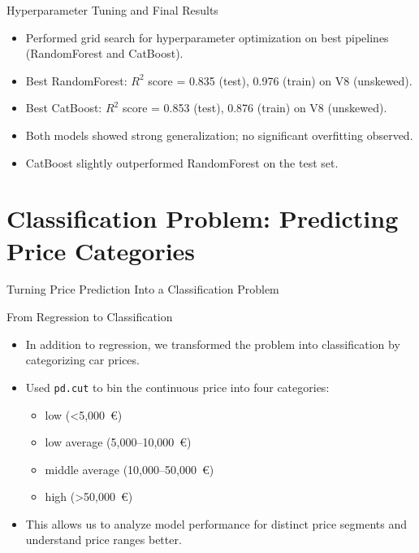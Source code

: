 \documentclass{beamer}
\begin{document}
\begin{frame}{Hyperparameter Tuning and Final Results}
    \begin{itemize}
        \item Performed grid search for hyperparameter optimization on best pipelines (RandomForest and CatBoost).
        \item Best RandomForest: $R^2$ score = 0.835 (test), 0.976 (train) on V8 (unskewed).
        \item Best CatBoost: $R^2$ score = 0.853 (test), 0.876 (train) on V8 (unskewed).
        \item Both models showed strong generalization; no significant overfitting observed.
        \item CatBoost slightly outperformed RandomForest on the test set.
    \end{itemize}
\end{frame}

\section{Classification Problem: Predicting Price Categories}
\begin{frame}
    \centering
    \Huge
    Turning Price Prediction Into a Classification Problem
\end{frame}


\begin{frame}{From Regression to Classification}
    \begin{itemize}
        \item In addition to regression, we transformed the problem into classification by categorizing car prices.
        \item Used \texttt{pd.cut} to bin the continuous price into four categories:
        \begin{itemize}
            \item low (\textless 5,000~€)
            \item low average (5,000–10,000~€)
            \item middle average (10,000–50,000~€)
            \item high (\textgreater 50,000~€)
        \end{itemize}
        \item This allows us to analyze model performance for distinct price segments and understand price ranges better.
    \end{itemize}
\end{frame}
\end{document}
